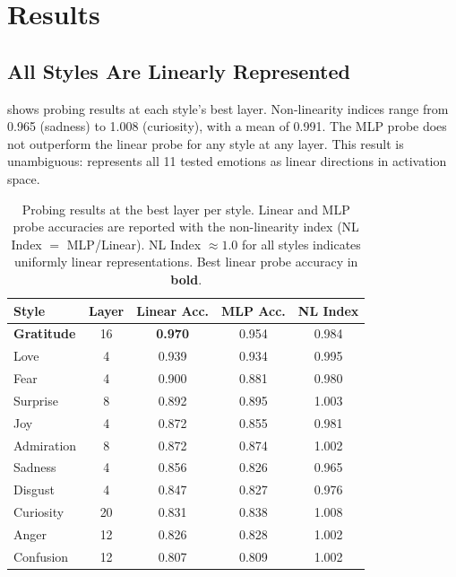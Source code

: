 \section{Results}
\label{sec:results}

\subsection{All Styles Are Linearly Represented}

 shows probing results at each style's best layer. Non-linearity indices range from 0.965 (sadness) to 1.008 (curiosity), with a mean of 0.991. The MLP probe does not outperform the linear probe for any style at any layer. This result is unambiguous: \pythia represents all 11 tested emotions as linear directions in activation space.

\begin{table}[t]
    \centering
    \caption{Probing results at the best layer per style. Linear and MLP probe accuracies are reported with the non-linearity index (NL Index $=$ MLP/Linear). NL Index $\approx 1.0$ for all styles indicates uniformly linear representations. Best linear probe accuracy in \textbf{bold}.}
    \label{tab:probing}
    \begin{tabular}{@{}lcccc@{}}
        \toprule
        Style & Layer & Linear Acc. & MLP Acc. & NL Index \\
        \midrule
        \textbf{Gratitude} & 16 & \textbf{0.970} & 0.954 & 0.984 \\
        Love & 4 & 0.939 & 0.934 & 0.995 \\
        Fear & 4 & 0.900 & 0.881 & 0.980 \\
        Surprise & 8 & 0.892 & 0.895 & 1.003 \\
        Joy & 4 & 0.872 & 0.855 & 0.981 \\
        Admiration & 8 & 0.872 & 0.874 & 1.002 \\
        Sadness & 4 & 0.856 & 0.826 & 0.965 \\
        Disgust & 4 & 0.847 & 0.827 & 0.976 \\
        Curiosity & 20 & 0.831 & 0.838 & 1.008 \\
        Anger & 12 & 0.826 & 0.828 & 1.002 \\
        Confusion & 12 & 0.807 & 0.809 & 1.002 \\
        \bottomrule
    \end{tabular}
\end{table}

